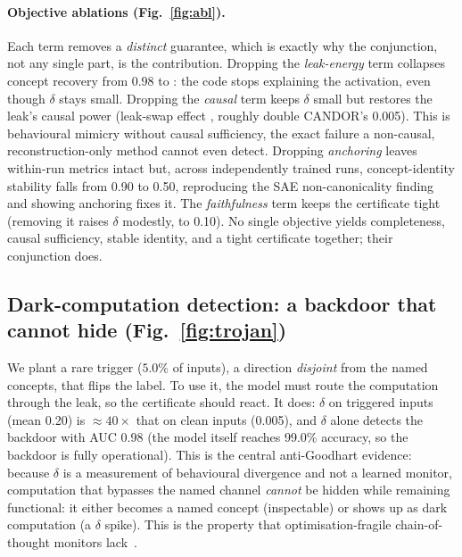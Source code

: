 \documentclass[11pt]{article}
\providecommand{\recovery}{0.98}\providecommand{\recoveryMin}{0.95}\providecommand{\monoMargin}{0.50}
\providecommand{\leakSwapCandor}{0.005}
\providecommand{\ablFaithDelta}{0.10}\providecommand{\ablFaithRecovery}{0.90}\providecommand{\ablFaithNecGap}{50}\providecommand{\ablFaithLeakSwap}{0.05}
\providecommand{\stabAnchored}{0.90}\providecommand{\stabFree}{0.50}
\providecommand{\trojanAuc}{0.98}\providecommand{\trojanDeltaClean}{0.005}\providecommand{\trojanDeltaTrojan}{0.20}
\providecommand{\trojanSeparation}{40}\providecommand{\trojanRate}{5.0}\providecommand{\trojanAcc}{99.0}
\begin{document}
\paragraph{Objective ablations (Fig.~\ref{fig:abl}).} Each term removes a \emph{distinct}
guarantee, which is exactly why the conjunction, not any single part, is the
contribution. Dropping the \emph{leak-energy} term collapses concept recovery from
\recovery{} to \ablLeakRecovery{}: the code stops explaining the activation, even though
$\delta$ stays small. Dropping the \emph{causal} term keeps $\delta$ small but restores
the leak's causal power (leak-swap effect \ablCausalLeakSwap{}, roughly double CANDOR's
\leakSwapCandor{}). This is behavioural mimicry without causal sufficiency, the exact
failure a non-causal, reconstruction-only method cannot even detect. Dropping \emph{anchoring}
leaves within-run metrics intact but, across independently trained runs, concept-identity
stability falls from \stabAnchored{} to \stabFree{}, reproducing the SAE non-canonicality
finding~\citep{leask2025canonical} and showing anchoring fixes it. The \emph{faithfulness}
term keeps the certificate tight (removing it raises $\delta$ modestly, to
\ablFaithDelta{}). No single objective yields completeness, causal sufficiency, stable
identity, and a tight certificate together; their conjunction does.

\subsection{Dark-computation detection: a backdoor that cannot hide (Fig.~\ref{fig:trojan})}
\label{sec:trojan}
We plant a rare trigger ($\trojanRate\%$ of inputs), a direction \emph{disjoint} from
the named concepts, that flips the label. To use it, the model must route the
computation through the leak, so the certificate should react. It does: $\delta$ on
triggered inputs (mean \trojanDeltaTrojan{}) is $\approx\!\trojanSeparation\times$ that
on clean inputs (\trojanDeltaClean{}), and $\delta$ alone detects the backdoor with AUC
\trojanAuc{} (the model itself reaches \trojanAcc\% accuracy, so the backdoor is fully
operational). This is the central anti-Goodhart evidence: because $\delta$ is a
measurement of behavioural divergence and not a learned monitor, computation that bypasses
the named channel \emph{cannot} be hidden while remaining functional: it either becomes
a named concept (inspectable) or shows up as dark computation (a $\delta$ spike). This is
the property that optimisation-fragile chain-of-thought monitors
lack~\citep{baker2025monitoring}.
\end{document}
